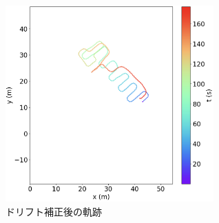 \begin{figure}[h]
	\centering
	\includegraphics[width=80mm]{image/pdr-remove-drift-two.jpg}
	\caption{ドリフト補正後の軌跡}    \label{fig:pdr-remove-drift}
\end{figure}
